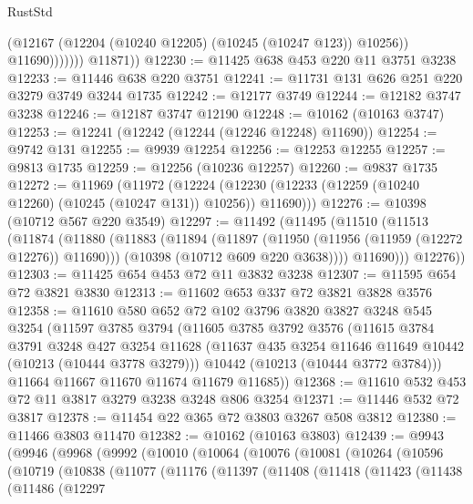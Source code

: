 \begin{lexlean}{RustStd}
\begin{coremodule}
{\begin{coremodule}
{{{{{{{{{{{{{{{{{{{{{{{{{{                      (@12167 (@12204 (@10240 @12205) (@10245 (@10247 @123)) @10256))
                      @11690)))))))
        @11871))
@12230 := @11425 @638 @453 @220 @11 @3751 @3238
@12233 := @11446 @638 @220 @3751
@12241 := @11731 @131 @626 @251 @220 @3279 @3749 @3244 @1735
@12242 := @12177 @3749
@12244 := @12182 @3747 @3238
@12246 := @12187 @3747 @12190
@12248 := @10162 (@10163 @3747)
@12253 := @12241 (@12242 (@12244 (@12246 @12248) @11690))
@12254 := @9742 @131
@12255 := @9939 @12254
@12256 := @12253 @12255
@12257 := @9813 @1735
@12259 := @12256 (@10236 @12257)
@12260 := @9837 @1735
@12272 := @11969
    (@11972
      (@12224 (@12230 (@12233 (@12259 (@10240 @12260) (@10245 (@10247 @131)) @10256)) @11690)))
@12276 := @10398 (@10712 @567 @220 @3549)
@12297 := @11492
    (@11495
      (@11510
        (@11513
          (@11874
            (@11880
              (@11883
                (@11894
                  (@11897 (@11950 (@11956 (@11959 (@12272 @12276)) @11690)))
                  (@10398 (@10712 @609 @220 @3638))))
              @11690)))
        @12276))
@12303 := @11425 @654 @453 @72 @11 @3832 @3238
@12307 := @11595 @654 @72 @3821 @3830
@12313 := @11602 @653 @337 @72 @3821 @3828 @3576
@12358 := @11610
    @580
    @652
    @72
    @102
    @3796
    @3820
    @3827
    @3248
    @545
    @3254
    (@11597
      @3785
      @3794
      (@11605
        @3785
        @3792
        @3576
        (@11615
          @3784
          @3791
          @3248
          @427
          @3254
          @11628
          (@11637 @435 @3254 @11646 @11649 @10442 (@10213 (@10444 @3778 @3279)))
          @10442
          (@10213 (@10444 @3772 @3784)))
        @11664
        @11667
        @11670
        @11674
        @11679
        @11685))
@12368 := @11610 @532 @453 @72 @11 @3817 @3279 @3238 @3248 @806 @3254
@12371 := @11446 @532 @72 @3817
@12378 := @11454 @22 @365 @72 @3803 @3267 @508 @3812
@12380 := @11466 @3803 @11470
@12382 := @10162 (@10163 @3803)
@12439 := @9943
    (@9946
      (@9968
        (@9992
          (@10010
            (@10064
              (@10076
                (@10081
                  (@10264
                    (@10596
                      (@10719
                        (@10838
                          (@11077
                            (@11176
                              (@11397
                                (@11408
                                  (@11418
                                    (@11423
                                      (@11438
                                        (@11486
                                          (@12297
}}}}}}}}}}}}}}}}}}}}}}}}}}
\end{coremodule}}
\end{coremodule}
\end{lexlean}
